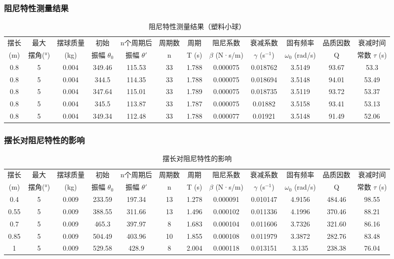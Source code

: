 \documentclass[lang=cn,a4paper,newtx,bibstyle=gb7714-2015]{elegantpaper}
\newcommand{\threelinetablestyle}{%
  \renewcommand{\arraystretch}{1.2}%
  \setlength{\tabcolsep}{3.5pt}%
  \small%
}
\numberwithin{equation}{section} %
\begin{document}
\subsubsection{阻尼特性测量结果}
\begin{table}[H]
\centering
\threelinetablestyle
\caption{阻尼特性测量结果（塑料小球）}
\setlength{\tabcolsep}{2pt}
\footnotesize
\begin{tabular}{cccccccccccc}
\toprule
摆长 & 最大 & 摆球质量 & 初始 & n个周期后 & 周期数 & 周期 & 阻尼系数 & 衰减系数 & 固有频率 & 品质因数 & 衰减时间 \\
(m) & 摆角(°) & (kg) & 振幅 $\theta_0$ & 振幅 $\theta'$ & n & T (s) & $\beta$ (N·s/m) & $\gamma$ (s$^{-1}$) & $\omega_0$ (rad/s) & Q & 常数 $\tau$ (s) \\
\midrule
0.8 & 5 & 0.004 & 349.46 & 115.53 & 33 & 1.788 & 0.000075 & 0.018762 & 3.5149 & 93.67 & 53.3 \\
0.8 & 5 & 0.004 & 344.5 & 114.35 & 33 & 1.788 & 0.000075 & 0.018694 & 3.5148 & 94.01 & 53.49 \\
0.8 & 5 & 0.004 & 347.64 & 115.01 & 33 & 1.789 & 0.000075 & 0.018735 & 3.5119 & 93.72 & 53.37 \\
0.8 & 5 & 0.004 & 345.5 & 113.87 & 33 & 1.787 & 0.000075 & 0.01882 & 3.5158 & 93.41 & 53.13 \\
0.8 & 5 & 0.004 & 349.34 & 112.48 & 33 & 1.788 & 0.000077 & 0.01921 & 3.5148 & 91.49 & 52.06 \\
\bottomrule
\end{tabular}
\label{tab:damping_measurement}
\end{table}
\label{app:damping_measurement}

\subsubsection{摆长对阻尼特性的影响}
\begin{table}[H]
\centering
\threelinetablestyle
\caption{摆长对阻尼特性的影响}
\setlength{\tabcolsep}{2pt}
\footnotesize
\begin{tabular}{cccccccccccc}
\toprule
摆长 & 最大 & 摆球质量 & 初始 & n个周期后 & 周期数 & 周期 & 阻尼系数 & 衰减系数 & 固有频率 & 品质因数 & 衰减时间 \\
(m) & 摆角(°) & (kg) & 振幅 $\theta_0$ & 振幅 $\theta'$ & n & T (s) & $\beta$ (N·s/m) & $\gamma$ (s$^{-1}$) & $\omega_0$ (rad/s) & Q & 常数 $\tau$ (s) \\
\midrule
0.4 & 5 & 0.009 & 233.59 & 197.34 & 13 & 1.278 & 0.000091 & 0.010147 & 4.9156 & 484.46 & 98.55 \\
0.55 & 5 & 0.009 & 388.55 & 311.66 & 13 & 1.496 & 0.000102 & 0.011336 & 4.1996 & 370.46 & 88.21 \\
0.7 & 5 & 0.009 & 465.3 & 397.97 & 8 & 1.683 & 0.000104 & 0.011606 & 3.7326 & 321.60 & 86.16 \\
0.85 & 5 & 0.009 & 504.49 & 403.96 & 10 & 1.855 & 0.000108 & 0.011979 & 3.3872 & 282.76 & 83.48 \\
1 & 5 & 0.009 & 529.58 & 428.9 & 8 & 2.004 & 0.000118 & 0.013151 & 3.135 & 238.38 & 76.04 \\
\bottomrule
\end{tabular}
\label{tab:length_effect_on_damping}
\end{table}
\end{document}

